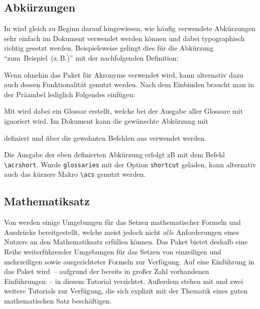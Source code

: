 \documentclass[%
  english,ngerman,%
  geometry=no,DIV=12,automark,%
]{tudscrartcl}
\newcommand*\newabbreviation[4][]{%
    \newacronym[type=abbreviation,#1]{#2}{#3}{#4}%
  }%
\begin{document}
\subsection{Abkürzungen}
In \cite{struckmann2007} wird gleich zu Beginn darauf hingewiesen, wie häufig 
verwendete Abkürzungen sehr einfach im Dokument verwendet werden können und 
dabei typographisch richtig gesetzt werden. Beispielsweise gelingt dies für die 
Abkürzung \enquote{zum~Beispiel~(z.\,B.)} mit der nachfolgenden Definition:
%
\begin{Hint}
\newcommand{\zB}{\mbox{z.\,B.}\xspace}
\end{Hint}
%
Wenn ohnehin das Paket  für Akronyme verwendet wird, kann 
alternativ dazu auch dessen Funktionalität genutzt werden. Nach dem Einbinden 
braucht man in der Präambel lediglich Folgendes einfügen:
%
\begin{Hint}
  \newcommand*\newabbreviation[4][]{%
    \newacronym[type=abbreviation,#1]{#2}{\mbox{#3\xspace}}{#4}%
  }%
\end{Hint}
%
Mit  wird dabei ein Glossar erstellt, welche bei der 
Ausgabe aller Glossare mit  ignoriert wird. Im Dokument 
kann die gewünschte Abkürzung mit 
%
\begin{Hint*}
\newabbreviation{zB}{z.\,B.}{zum Beispiel}
\end{Hint*}
%
definiert und über die gewohnten Befehlen aus  verwendet 
werden.
%
\begin{Hint*}
Die Ausgabe der eben definierten Abkürzung erfolgt \acrshort{zB} mit dem 
Befehl \texttt{\textbackslash acrshort}. Wurde \texttt{glossaries} mit 
der Option \texttt{shortcut} geladen, kann alternativ auch das kürzere 
Makro \texttt{\textbackslash acs} genutzt werden.
\end{Hint*}


\subsection{Mathematiksatz}
Von  werden einige Umgebungen für das Setzen mathematischer 
Formeln und Ausdrücke bereitgestellt, welche meist jedoch nicht \emph{alle} 
Anforderungen eines Nutzers an den Mathematiksatz erfüllen können. Das Paket
 bietet deshalb eine Reihe weiterführender Umgebungen für das 
Setzen von einzeiligen und mehrzeiligen sowie ausgerichteter Formeln zur 
Verfügung. Auf eine Einführung in das Paket wird~-- aufgrund der bereits in 
großer Zahl vorhandenen Einführungen~-- in diesem Tutorial verzichtet. Außerdem 
stehen mit  und  zwei weitere Tutorials 
zur Verfügung, die sich explizit mit der Thematik eines guten mathematischen 
Satz beschäftigen.
\end{document}
